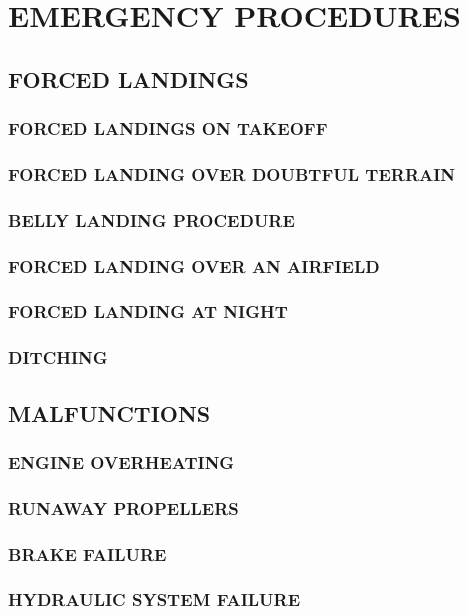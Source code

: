 \chapter{EMERGENCY PROCEDURES}
\minitoc
\cleardoublepage


\section{FORCED LANDINGS}
\subsection{FORCED LANDINGS ON TAKEOFF}
\subsection{FORCED LANDING OVER DOUBTFUL TERRAIN}
\subsection{BELLY LANDING PROCEDURE}
\subsection{FORCED LANDING OVER AN AIRFIELD}
\subsection{FORCED LANDING AT NIGHT}
\subsection{DITCHING}


\section{MALFUNCTIONS}
\subsection{ENGINE OVERHEATING}
\subsection{RUNAWAY PROPELLERS}
\subsection{BRAKE FAILURE}
\subsection{HYDRAULIC SYSTEM FAILURE}

